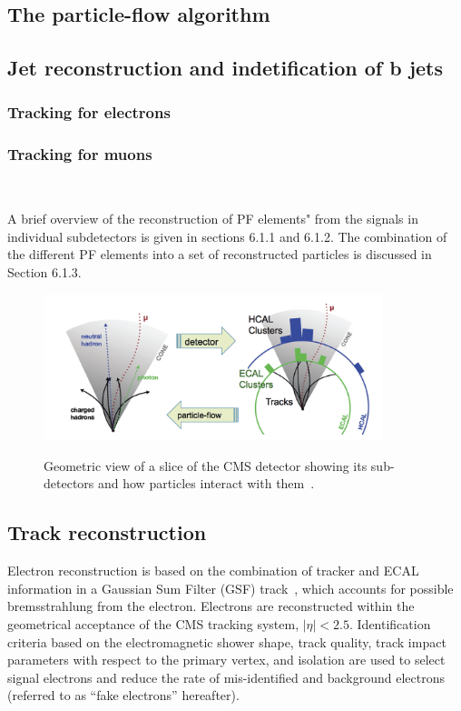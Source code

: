 \subsection{The particle-flow algorithm}\label{sec:PF}
\subsection{Jet reconstruction and indetification of b jets}\label{sec:pfjet}
\subsubsection{Tracking for electrons}\label{sec:trackele}
\subsubsection{Tracking for muons}\label{sec:trackmuon}




~\cite{CMS:particleflow}
~\cite{Collaboration_2014_tracking}
~\cite{Collaboration_2010_alligment}






A brief overview of the reconstruction of PF elements" from the signals in individual subdetectors
is given in sections 6.1.1 and 6.1.2. The combination of the different
PF elements into a set of reconstructed particles is discussed in
Section 6.1.3.

\begin{figure}[h]
\centering
\includegraphics[width=0.88\textwidth]{Figures/c2/pfscheme}\\
\caption{Geometric view of a slice of the CMS detector showing its sub-detectors and how particles interact with them~\cite{Petrucciani:2650974}.}
\label{fig:pfscheme}
\end{figure} 


\subsection{Track reconstruction} 
Electron reconstruction is based on the combination of tracker and
ECAL information in a Gaussian Sum Filter (GSF)
track~\cite{Khachatryan:2015hwa}, which accounts for possible
bremsstrahlung from the electron.
Electrons are reconstructed within the geometrical acceptance of the
CMS tracking system, $|\eta|<2.5$.
Identification criteria based on the electromagnetic shower shape, track
quality, track impact parameters with respect to the primary vertex,
and isolation are used to select signal electrons and reduce the rate
of mis-identified and background electrons (referred to as ``fake
electrons'' hereafter).

